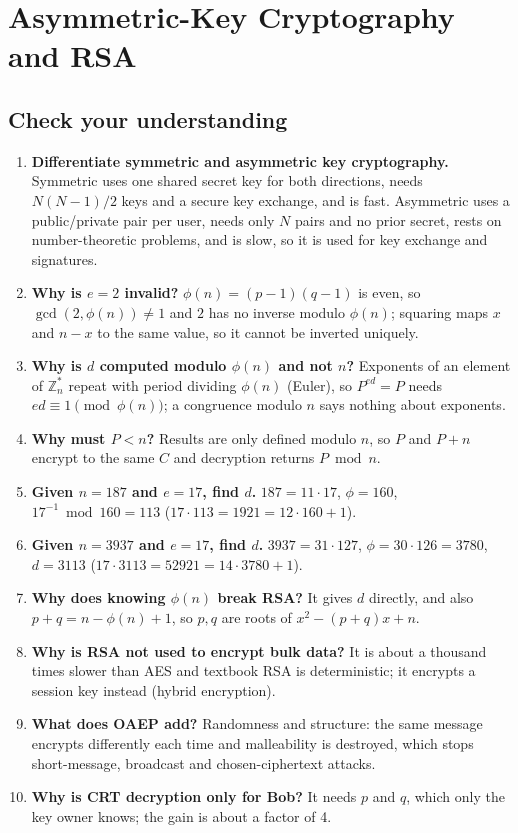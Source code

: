\section{Asymmetric-Key Cryptography and RSA \new}\label{q:17_rsa}

\subsection*{Check your understanding}
\begin{enumerate}[leftmargin=1.6em]
  \item \textbf{Differentiate symmetric and asymmetric key cryptography.} Symmetric uses one shared secret key for both directions, needs $N(N-1)/2$ keys and a secure key exchange, and is fast. Asymmetric uses a public/private pair per user, needs only $N$ pairs and no prior secret, rests on number-theoretic problems, and is slow, so it is used for key exchange and signatures.
  \item \textbf{Why is $e = 2$ invalid?} $\phi(n) = (p-1)(q-1)$ is even, so $\gcd(2, \phi(n)) \ne 1$ and $2$ has no inverse modulo $\phi(n)$; squaring maps $x$ and $n - x$ to the same value, so it cannot be inverted uniquely.
  \item \textbf{Why is $d$ computed modulo $\phi(n)$ and not $n$?} Exponents of an element of $\mathbb{Z}_n^*$ repeat with period dividing $\phi(n)$ (Euler), so $P^{ed} = P$ needs $ed \equiv 1 \pmod{\phi(n)}$; a congruence modulo $n$ says nothing about exponents.
  \item \textbf{Why must $P < n$?} Results are only defined modulo $n$, so $P$ and $P + n$ encrypt to the same $C$ and decryption returns $P \bmod n$.
  \item \textbf{Given $n = 187$ and $e = 17$, find $d$.} $187 = 11 \cdot 17$, $\phi = 160$, $17^{-1} \bmod 160 = 113$ ($17 \cdot 113 = 1921 = 12 \cdot 160 + 1$).
  \item \textbf{Given $n = 3937$ and $e = 17$, find $d$.} $3937 = 31 \cdot 127$, $\phi = 30 \cdot 126 = 3780$, $d = 3113$ ($17 \cdot 3113 = 52921 = 14 \cdot 3780 + 1$).
  \item \textbf{Why does knowing $\phi(n)$ break RSA?} It gives $d$ directly, and also $p + q = n - \phi(n) + 1$, so $p, q$ are roots of $x^2 - (p+q)x + n$.
  \item \textbf{Why is RSA not used to encrypt bulk data?} It is about a thousand times slower than AES and textbook RSA is deterministic; it encrypts a session key instead (hybrid encryption).
  \item \textbf{What does OAEP add?} Randomness and structure: the same message encrypts differently each time and malleability is destroyed, which stops short-message, broadcast and chosen-ciphertext attacks.
  \item \textbf{Why is CRT decryption only for Bob?} It needs $p$ and $q$, which only the key owner knows; the gain is about a factor of 4.
\end{enumerate}
